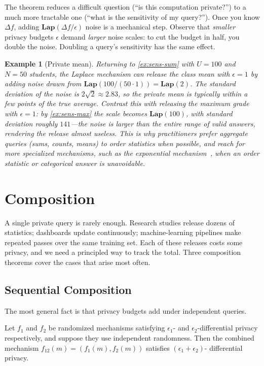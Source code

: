 \documentclass[11pt]{article}
\newcommand{\lap}{\mathbf{Lap}}
\newcommand{\sens}{\Delta}
\newtheorem{example}[example]{Example}
\begin{document}
The theorem reduces a difficult question (``is this computation private?'')
to a much more tractable one (``what is the sensitivity of my query?'').
Once you know $\sens f$, adding $\lap(\sens f / \epsilon)$ noise is a
mechanical step.  Observe that \emph{smaller} privacy budgets $\epsilon$
demand \emph{larger} noise scales: to cut the budget in half, you double the
noise.  Doubling a query's sensitivity has the same effect.

\begin{example}[Private mean]
\label{ex:private-mean}
Returning to \autoref{ex:sens-sum} with $U = 100$ and $N = 50$ students, the
Laplace mechanism can release the class mean with $\epsilon = 1$ by adding
noise drawn from $\lap(100/(50 \cdot 1)) = \lap(2)$.  The standard deviation
of the noise is $2\sqrt 2 \approx 2.83$, so the private mean is typically
within a few points of the true average.  Contrast this with releasing the
\emph{maximum} grade with $\epsilon = 1$: by \autoref{ex:sens-max} the scale
becomes $\lap(100)$, with standard deviation roughly $141$---the noise is
larger than the entire range of valid answers, rendering the release almost
useless.  This is why practitioners prefer aggregate queries (sums, counts,
means) to order statistics when possible, and reach for more specialized
mechanisms, such as the \emph{exponential mechanism}~\citep{Dwork14fttcs},
when an order statistic or categorical answer is unavoidable.
\end{example}

\section{Composition}

A single private query is rarely enough.  Research studies release dozens of
statistics; dashboards update continuously; machine-learning pipelines make
repeated passes over the same training set.  Each of these releases costs
some privacy, and we need a principled way to track the total.  Three
composition theorems cover the cases that arise most often.

\subsection{Sequential Composition}

The most general fact is that privacy budgets add under independent queries.

\begin{theorem}
\label{thm:seq-comp}
Let $f_1$ and $f_2$ be randomized mechanisms satisfying $\epsilon_1$- and
$\epsilon_2$-differential privacy respectively, and suppose they use
independent randomness.  Then the combined mechanism
$f_{12}(m) = (f_1(m), f_2(m))$ satisfies $(\epsilon_1 + \epsilon_2)$-
differential privacy.
\end{theorem}
\end{document}
